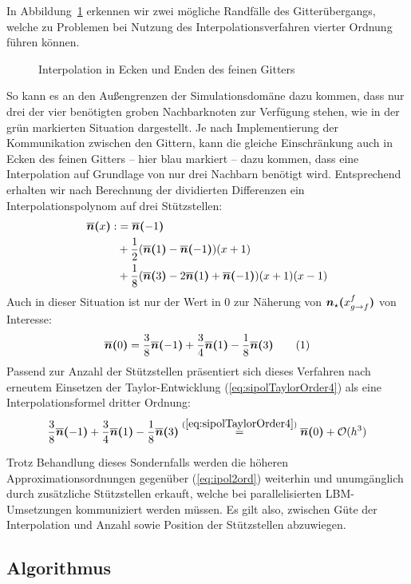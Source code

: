 In Abbildung~\ref{fig:InterpolationEdgeCase} erkennen wir zwei mögliche Randfälle des Gitterübergangs, welche zu Problemen bei Nutzung des Interpolationsverfahren vierter Ordnung führen können.
\begin{figure}[h]
\centering

\caption{Interpolation in Ecken und Enden des feinen Gitters}
\label{fig:InterpolationEdgeCase}
\end{figure}

\noindent
So kann es an den Außengrenzen der Simulationsdomäne dazu kommen, dass nur drei der vier benötigten groben Nachbarknoten zur Verfügung stehen, wie in der grün markierten Situation dargestellt.
Je nach Implementierung der Kommunikation zwischen den Gittern, kann die gleiche Einschränkung auch in Ecken des feinen Gitters -- hier blau markiert -- dazu kommen, dass eine Interpolation auf Grundlage von nur drei Nachbarn benötigt wird. Entsprechend erhalten wir nach Berechnung der dividierten Differenzen ein Interpolationspolynom auf drei Stützstellen:
\begin{align*}
\overline{\boldsymbol{n}}\boldsymbol{(}{x}\boldsymbol{)} :&= \overline{\boldsymbol{n}}\boldsymbol{(}{-1}\boldsymbol{)} \\
&+ \frac{1}{2}(\overline{\boldsymbol{n}}\boldsymbol{(}{1}\boldsymbol{)}-\overline{\boldsymbol{n}}\boldsymbol{(}{-1}\boldsymbol{)})(x+1)\\
&+ \frac{1}{8}(\overline{\boldsymbol{n}}\boldsymbol{(}{3}\boldsymbol{)}-2\overline{\boldsymbol{n}}\boldsymbol{(}{1}\boldsymbol{)}+\overline{\boldsymbol{n}}\boldsymbol{(}{-1}\boldsymbol{)})(x+1)(x-1)
\end{align*}
Auch in dieser Situation ist nur der Wert in \(0\) zur Näherung von \(\boldsymbol{n}_{\star}\boldsymbol{(}{x_{g \to f}^f}\boldsymbol{)}\) von Interesse:
\[\sipolarg{0} = \frac{3}{8}\sipolarg{-1} + \frac{3}{4}\sipolarg{1} - \frac{1}{8}\sipolarg{3} \numberthis\label{eq:ipol3ord}\]
Passend zur Anzahl der Stützstellen präsentiert sich dieses Verfahren nach erneutem Einsetzen der Taylor-Entwicklung (\ref{eq:sipolTaylorOrder4}) als eine Interpolationsformel dritter Ordnung:
\[\frac{3}{8}\overline{\boldsymbol{n}}\boldsymbol{(}{-1}\boldsymbol{)} + \frac{3}{4}\overline{\boldsymbol{n}}\boldsymbol{(}{1}\boldsymbol{)} - \frac{1}{8}\overline{\boldsymbol{n}}\boldsymbol{(}{3}\boldsymbol{)} \stackrel{(\ref{eq:sipolTaylorOrder4})}{=} \overline{\boldsymbol{n}}\boldsymbol{(}{0}\boldsymbol{)} + \mathcal{O}(h^3)\]

Trotz Behandlung dieses Sondernfalls werden die höheren Approximationsordnungen gegenüber (\ref{eq:ipol2ord}) weiterhin und unumgänglich durch zusätzliche Stützstellen erkauft, welche bei parallelisierten LBM-Umsetzungen kommuniziert werden müssen. Es gilt also, zwischen Güte der Interpolation und Anzahl sowie Position der Stützstellen abzuwiegen.

\newpage
\subsection{Algorithmus}\label{kap:Algorithmus}

